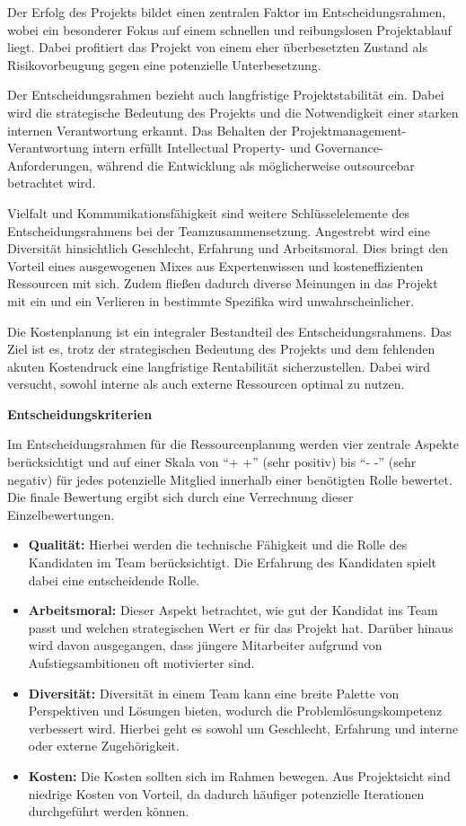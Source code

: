 Der Erfolg des Projekts bildet einen zentralen Faktor im Entscheidungsrahmen, wobei ein besonderer Fokus auf einem schnellen und reibungslosen Projektablauf liegt. Dabei profitiert das Projekt von einem eher überbesetzten Zustand als Risikovorbeugung gegen eine potenzielle Unterbesetzung.

Der Entscheidungsrahmen bezieht auch langfristige Projektstabilität ein. Dabei wird die strategische Bedeutung des Projekts und die Notwendigkeit einer starken internen Verantwortung erkannt. Das Behalten der Projektmanagement-Verantwortung intern erfüllt Intellectual Property- und Governance-Anforderungen, während die Entwicklung als möglicherweise outsourcebar betrachtet wird.

Vielfalt und Kommunikationsfähigkeit sind weitere Schlüsselelemente des Entscheidungsrahmens bei der Teamzusammensetzung. Angestrebt wird eine Diversität hinsichtlich Geschlecht, Erfahrung und Arbeitsmoral. Dies bringt den Vorteil eines ausgewogenen Mixes aus Expertenwissen und kosteneffizienten Ressourcen mit sich. Zudem fließen dadurch diverse Meinungen in das Projekt mit ein und ein Verlieren in bestimmte Spezifika wird unwahrscheinlicher.

Die Kostenplanung ist ein integraler Bestandteil des Entscheidungsrahmens. Das Ziel ist es, trotz der strategischen Bedeutung des Projekts und dem fehlenden akuten Kostendruck eine langfristige Rentabilität sicherzustellen. Dabei wird versucht, sowohl interne als auch externe Ressourcen optimal zu nutzen.
\pagebreak
\vspace*{0.5cm}

\textbf{Entscheidungskriterien}
\vspace*{0.1cm}

Im Entscheidungsrahmen für die Ressourcenplanung werden vier zentrale Aspekte berücksichtigt und auf einer Skala von \enquote{+ +} (sehr positiv) bis \enquote{- -} (sehr negativ) für jedes potenzielle Mitglied innerhalb einer benötigten Rolle bewertet. Die finale Bewertung ergibt sich durch eine Verrechnung dieser Einzelbewertungen.

\begin{itemize}
\item \textbf{Qualität:} Hierbei werden die technische Fähigkeit und die Rolle des Kandidaten im Team berücksichtigt. Die Erfahrung des Kandidaten spielt dabei eine entscheidende Rolle.
\item \textbf{Arbeitsmoral:} Dieser Aspekt betrachtet, wie gut der Kandidat ins Team passt und welchen strategischen Wert er für das Projekt hat. Darüber hinaus wird davon ausgegangen, dass jüngere Mitarbeiter aufgrund von Aufstiegsambitionen oft motivierter sind.
\item \textbf{Diversität:} Diversität in einem Team kann eine breite Palette von Perspektiven und Lösungen bieten, wodurch die Problemlösungskompetenz verbessert wird. Hierbei geht es sowohl um Geschlecht, Erfahrung und interne oder externe Zugehörigkeit.
\item \textbf{Kosten:} Die Kosten sollten sich im Rahmen bewegen. Aus Projektsicht sind niedrige Kosten von Vorteil, da dadurch häufiger potenzielle Iterationen durchgeführt werden können.
\end{itemize}

